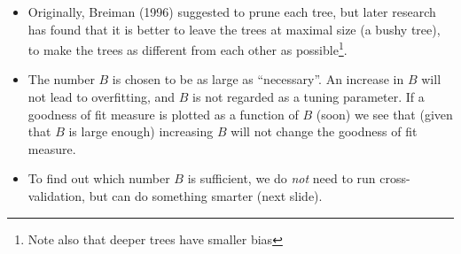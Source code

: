 \documentclass[10pt,ignorenonframetext,]{beamer}
\providecommand{\tightlist}{%
  \setlength{\itemsep}{0pt}\setlength{\parskip}{0pt}}
\begin{document}
\begin{frame}

\begin{itemize}
\tightlist
\item
  Originally, Breiman (1996) suggested to prune each tree, but later
  research has found that it is better to leave the trees at maximal
  size (a bushy tree), to make the trees as different from each other as
  possible\footnote{Note also that deeper trees have smaller bias}.
\end{itemize}

\vspace{1mm}

\begin{itemize}
\tightlist
\item
  The number \(B\) is chosen to be as large as ``necessary''. An
  increase in \(B\) will not lead to overfitting, and \(B\) is not
  regarded as a tuning parameter. If a goodness of fit measure is
  plotted as a function of \(B\) (soon) we see that (given that \(B\) is
  large enough) increasing \(B\) will not change the goodness of fit
  measure.
\end{itemize}

\vspace{1mm}

\begin{itemize}
\tightlist
\item
  To find out which number \(B\) is sufficient, we do \emph{not} need to
  run cross-validation, but can do something smarter (next slide).
\end{itemize}

\end{frame}
\end{document}
